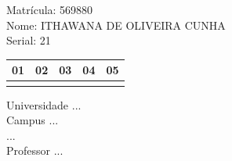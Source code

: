 \documentclass[10pt,a4paper,twocolumn]{report}
\begin{document}
Matrícula: 569880\\ Nome: ITHAWANA DE OLIVEIRA CUNHA \\ Serial: 21\\
\begin{tabular}{|l|l|l|l|l|}\hline
01  &02  &03  &04  &05 \\ \hline 
 & & & & \\ \hline 
\end{tabular}
 \cleardoublepage 

\begin{flushleft}
Universidade ...\\
Campus ...\\
...\\
Professor ...\\
\end{flushleft}
\end{document}
